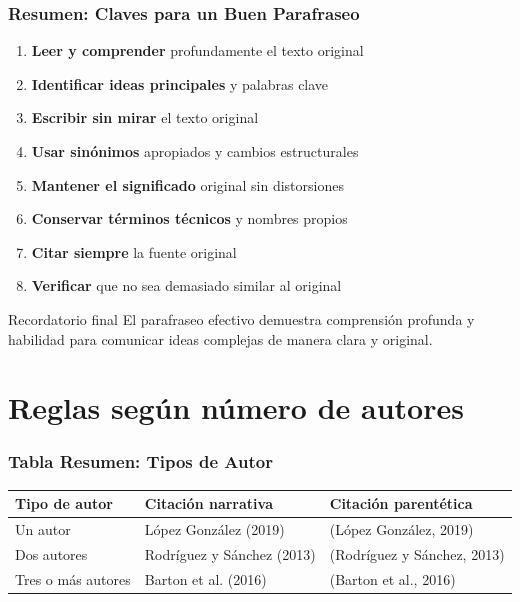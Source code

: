 \documentclass[aspectratio=169]{beamer}
\begin{document}
\begin{frame}
	\frametitle{Resumen: Claves para un Buen Parafraseo}
	
	\begin{enumerate}
		\item \textbf{Leer y comprender} profundamente el texto original
		\item \textbf{Identificar ideas principales} y palabras clave
		\item \textbf{Escribir sin mirar} el texto original
		\item \textbf{Usar sinónimos} apropiados y cambios estructurales
		\item \textbf{Mantener el significado} original sin distorsiones
		\item \textbf{Conservar términos técnicos} y nombres propios
		\item \textbf{Citar siempre} la fuente original
		\item \textbf{Verificar} que no sea demasiado similar al original
	\end{enumerate}
	
	\vspace{0.5em}
	
	\begin{alertblock}{Recordatorio final}
		El parafraseo efectivo demuestra comprensión profunda y habilidad para comunicar ideas complejas de manera clara y original.
	\end{alertblock}
\end{frame}




















\section{Reglas según número de autores}

\begin{frame}
	\frametitle{Tabla Resumen: Tipos de Autor}
	\small
	\begin{tabular}{>{\raggedright}p{3.5cm}|>{\raggedright}p{3.5cm}|>{\raggedright\arraybackslash}p{3.5cm}}
		\toprule
		\textbf{Tipo de autor} & \textbf{Citación narrativa} & \textbf{Citación parentética} \\
		\midrule
		Un autor & López González (2019) & (López González, 2019) \\
		\midrule
		Dos autores & Rodríguez y Sánchez (2013) & (Rodríguez y Sánchez, 2013) \\
		\midrule
		Tres o más autores & Barton et al. (2016) & (Barton et al., 2016) \\
		\bottomrule
	\end{tabular}
\end{frame}
\end{document}
